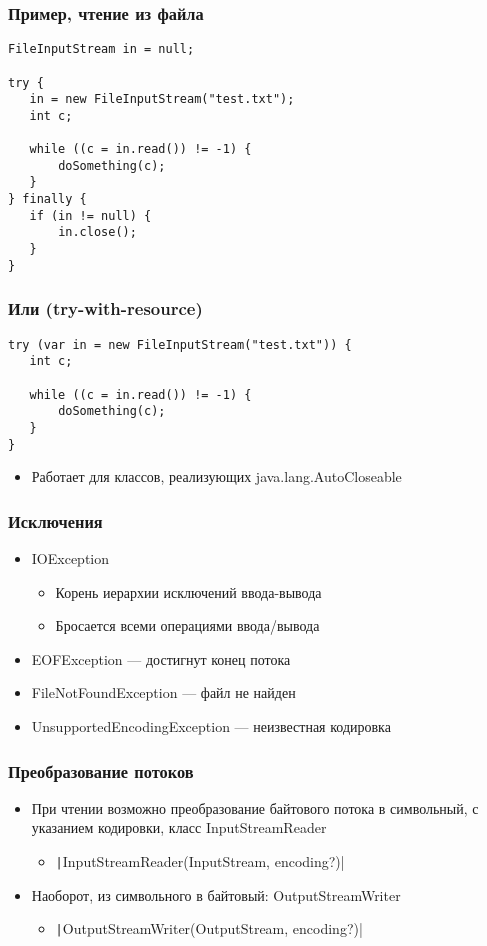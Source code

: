 \documentclass[xetex,mathserif,serif]{beamer}
\begin{document}
	\begin{frame}[fragile]
		\frametitle{Пример, чтение из файла}
		\begin{verbatim}
FileInputStream in = null;

try {
   in = new FileInputStream("test.txt");
   int c;

   while ((c = in.read()) != -1) {
       doSomething(c);
   }
} finally {
   if (in != null) {
       in.close();
   }
}
		\end{verbatim}
	\end{frame}

	\begin{frame}[fragile]
		\frametitle{Или (try-with-resource)}
		\begin{verbatim}
try (var in = new FileInputStream("test.txt")) {
   int c;

   while ((c = in.read()) != -1) {
       doSomething(c);
   }
}
		\end{verbatim}
		\begin{itemize}
			\item Работает для классов, реализующих java.lang.AutoCloseable
		\end{itemize}
	\end{frame}

	\begin{frame}
		\frametitle{Исключения}
		\begin{itemize}
			\item IOException 
			\begin{itemize}
				\item Корень иерархии исключений ввода-вывода
				\item Бросается всеми операциями ввода/вывода
			\end{itemize}
			\item EOFException --- достигнут конец потока
			\item FileNotFoundException --- файл не найден
			\item UnsupportedEncodingException --- неизвестная кодировка
		\end{itemize}
	\end{frame}

	\begin{frame}
		\frametitle{Преобразование потоков}
		\begin{itemize}
			\item При чтении возможно преобразование байтового потока в символьный, с указанием кодировки, класс InputStreamReader
			\begin{itemize}
				\item \texttt|InputStreamReader(InputStream, encoding?)|
			\end{itemize}
			\item Наоборот, из символьного в байтовый: OutputStreamWriter
			\begin{itemize}
				\item \texttt|OutputStreamWriter(OutputStream, encoding?)|
			\end{itemize}
		\end{itemize}
	\end{frame}
\end{document}
